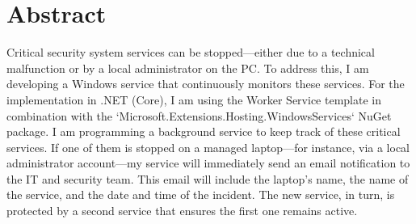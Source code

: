 

\chapter*{Abstract}
\label{ch:samenvatting-en}

Critical security system services can be stopped—either due to a technical malfunction or by a local administrator on the PC. To address this, I am developing a Windows service that continuously monitors these services. For the implementation in .NET (Core), I am using the Worker Service template in combination with the `Microsoft.Extensions.Hosting.WindowsServices` NuGet package.
I am programming a background service to keep track of these critical services. If one of them is stopped on a managed laptop—for instance, via a local administrator account—my service will immediately send an email notification to the IT and security team. This email will include the laptop's name, the name of the service, and the date and time of the incident.
The new service, in turn, is protected by a second service that ensures the first one remains active.

